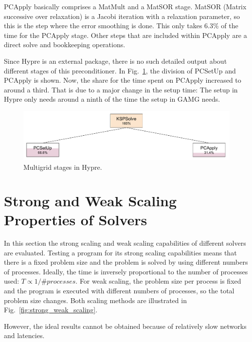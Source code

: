 PCApply basically comprises a MatMult and a MatSOR stage. MatSOR (Matrix successive over relaxation) is a Jacobi iteration with a relaxation parameter, so this is the step where the error smoothing is done. This only takes 6.3\% of the time for the PCApply stage. Other steps that are included within PCApply are a direct solve and bookkeeping operations.

Since Hypre is an external package, there is no such detailed output about different stages of this preconditioner. In Fig.~\ref{fig:multigrid_hierarchy_hypre}, the division of PCSetUp and PCApply is shown. Now, the share for the time spent on PCApply increased to around a third. That is due to a major change in the setup time: The setup in Hypre only needs around a ninth of the time the setup in GAMG needs. 

\begin{figure}[tbp]
	\centering
	\includegraphics[width=1.\textwidth]{Multigrid_hierarchy_Hypre}
	\caption{Multigrid stages in Hypre.} 
	\label{fig:multigrid_hierarchy_hypre}
\end{figure}



\section{Strong and Weak Scaling Properties of Solvers}

In this section the strong scaling and weak scaling capabilities of different solvers are evaluated. Testing a program for its strong scaling capabilities means that there is a fixed problem size and the problem is solved by using different numbers of processes. Ideally, the time is inversely proportional to the number of processes used: $T \propto 1/\textit{\#processes}$. For weak scaling, the problem size per process is fixed and the program is executed with different numbers of processes, so the total problem size changes. Both scaling methods are illustrated in Fig.~\ref{fig:strong_weak_scaling}. 

However, the ideal results cannot be obtained because of relatively slow networks and latencies.



